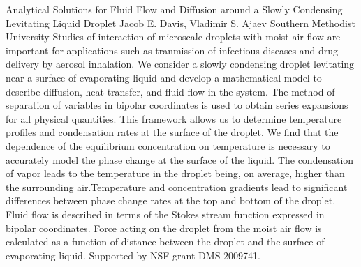 \vspace{1.5ex}
\abs
{Analytical Solutions for Fluid Flow and Diffusion around a Slowly Condensing Levitating Liquid Droplet}
{Jacob E. Davis, Vladimir S. Ajaev}
{Southern Methodist University}
{Studies of interaction of microscale droplets with moist air flow are important for applications such as tranmission of infectious diseases and drug delivery by aerosol inhalation. We consider a slowly condensing droplet levitating near a surface of evaporating liquid and develop a mathematical model to describe diffusion, heat transfer, and fluid flow in the system. The method of separation of variables in bipolar coordinates is used to obtain series expansions for all physical quantities. This framework allows us to determine temperature profiles and condensation rates at the surface of the droplet. We find that the dependence of the equilibrium concentration on temperature is necessary to accurately model the phase change at the surface of the liquid. The condensation of vapor leads to the temperature in the droplet being, on average, higher than the surrounding air.Temperature and concentration gradients lead to significant differences between phase change rates at the top and bottom of the droplet. Fluid flow is described in terms of the Stokes stream function expressed in bipolar coordinates. Force acting on the droplet from the moist air flow is calculated as a function of distance between the droplet and the surface of evaporating liquid. Supported by NSF grant DMS-2009741.}


